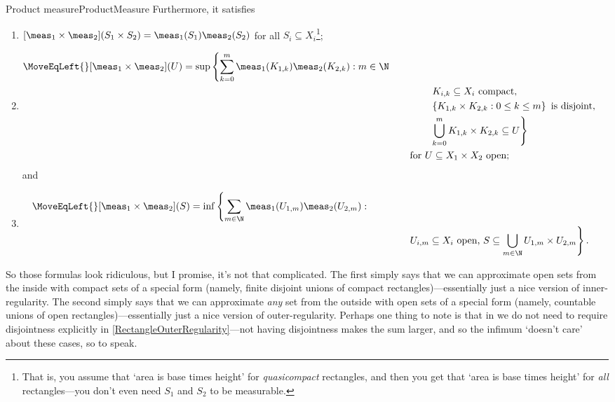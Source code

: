 \begin{thm}{Product measure}{ProductMeasure}
Furthermore, it satisfies
\begin{enumerate}
\item $[\meas _1\times \meas _2](S_1\times S_2)=\meas _1(S_1)\meas _2(S_2)$ for all $S_i\subseteq X_i$\footnote{That is, you assume that `area is base times height' for \emph{quasicompact} rectangles, and then you get that `area is base times height' for \emph{all} rectangles---you don't even need $S_1$ and $S_2$ to be measurable.};
\item
{\scriptsize
\begin{equation}\label{RectangleInnerRegularity}
\begin{split}
\MoveEqLeft {}
[\meas _1\times \meas _2](U)=\sup \left\{ \sum _{k=0}^m\meas _1(K_{1,k})\meas _2(K_{2,k}):m\in \N \right. \\
& \qquad \qquad \left. K_{i,k}\subseteq X_i\text{ compact},\right. \\
& \qquad \qquad \left. \left\{ K_{1,k}\times K_{2,k}:0\leq k\leq m\right\} \text{ is disjoint},\right. \\
& \qquad \qquad \left. \bigcup _{k=0}^mK_{1,k}\times K_{2,k}\subseteq U\right\} \\ & \qquad \text{for }U\subseteq X_1\times X_2\text{ open};
\end{split}
\end{equation}
}
and
\item
{\scriptsize
\begin{equation}\label{RectangleOuterRegularity}
\begin{split}
\MoveEqLeft {}
[\meas _1\times \meas _2](S)=\inf \left\{ \sum _{m\in \N}\meas _1(U_{1,m})\meas _2(U_{2,m}):\right. \\ & \qquad \qquad \left. U_{i,m}\subseteq X_i\text{ open, }S\subseteq \bigcup _{m\in \N}U_{1,m}\times U_{2,m}\right\} .
\end{split}
\end{equation}
}
\end{enumerate}
\begin{rmk}
So those formulas look ridiculous, but I promise, it's not that complicated.  The first simply says that we can approximate open sets from the inside with compact sets of a special form (namely, finite disjoint unions of compact rectangles)---essentially just a nice version of inner-regularity.  The second simply says that we can approximate \emph{any} set from the outside with open sets of a special form (namely, countable unions of open rectangles)---essentially just a nice version of outer-regularity.  Perhaps one thing to note is that in we do not need to require disjointness explicitly in \eqref{RectangleOuterRegularity}---not having disjointness makes the sum larger, and so the infimum `doesn't care' about these cases, so to speak.

\end{rmk}
\end{thm}
